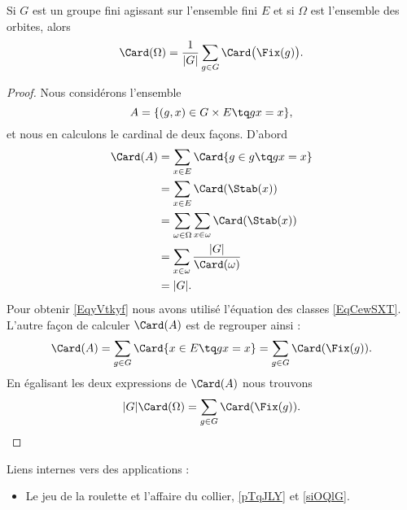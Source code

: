 \begin{theorem}      \label{THOooEFDMooDfosOw}
    Si \( G\) est un groupe fini agissant sur l'ensemble fini \( E\) et si \( \Omega\) est l'ensemble des orbites, alors
    \begin{equation}    \label{EqTUsblv}
        \Card(\Omega)=\frac{1}{ | G | }\sum_{g\in G}\Card\big( \Fix(g) \big).
    \end{equation}
\end{theorem}

\begin{proof}
    Nous considérons l'ensemble 
    \begin{equation}
        A=\{ (g,x)\in G\times E\tq gx=x \},
    \end{equation}
    et nous en calculons le cardinal de deux façons. D'abord
    \begin{subequations}
        \begin{align}
            \Card(A)&=\sum_{x\in E}\Card\{ g\in g\tq gx=x \}\\
            &=\sum_{x\in E}\Card(\Stab(x))\\
            &=\sum_{\omega\in \Omega}\sum_{x\in \omega}\Card(\Stab(x))\\
            &=\sum_{x\in \omega}\frac{ | G | }{ \Card(\omega) }     \label{EqyVtkyf}\\
            &=| G |.
        \end{align}
    \end{subequations}
    Pour obtenir \eqref{EqyVtkyf} nous avons utilisé l'équation des classes \eqref{EqCewSXT}. L'autre façon de calculer \( \Card(A)\) est de regrouper ainsi :
    \begin{equation}
        \Card(A)=\sum_{g\in G}\Card\{ x\in E\tq gx=x \}=\sum_{g\in G}\Card(\Fix(g)).
    \end{equation}
    En égalisant les deux expressions de \( \Card(A)\) nous trouvons
    \begin{equation}
        | G |\Card(\Omega)=\sum_{g\in G}\Card(\Fix(g)).
    \end{equation}
\end{proof}

Liens internes vers des applications :
\begin{itemize}
    \item Le jeu de la roulette et l'affaire du collier, \ref{pTqJLY} et \ref{siOQlG}.
\end{itemize}

